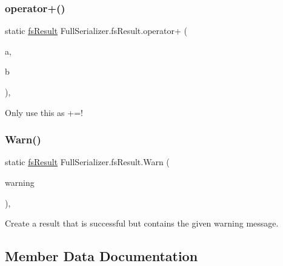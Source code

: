 \subsubsection{\texorpdfstring{operator+()}{operator+()}}
{\footnotesize\ttfamily static \hyperlink{struct_full_serializer_1_1fs_result}{fs\+Result} Full\+Serializer.\+fs\+Result.\+operator+ (\begin{DoxyParamCaption}\item[{\hyperlink{struct_full_serializer_1_1fs_result}{fs\+Result}}]{a,  }\item[{\hyperlink{struct_full_serializer_1_1fs_result}{fs\+Result}}]{b }\end{DoxyParamCaption})\hspace{0.3cm}{\ttfamily [inline]}, {\ttfamily [static]}}



Only use this as +=! 

\mbox{\label{struct_full_serializer_1_1fs_result_a28eab13689fc7ff2b0a1d0326e044463}} 
\subsubsection{\texorpdfstring{Warn()}{Warn()}}
{\footnotesize\ttfamily static \hyperlink{struct_full_serializer_1_1fs_result}{fs\+Result} Full\+Serializer.\+fs\+Result.\+Warn (\begin{DoxyParamCaption}\item[{string}]{warning }\end{DoxyParamCaption})\hspace{0.3cm}{\ttfamily [inline]}, {\ttfamily [static]}}



Create a result that is successful but contains the given warning message. 



\subsection{Member Data Documentation}
\mbox{\label{struct_full_serializer_1_1fs_result_a21c921f6a0a99b1ba5acc993e669f3cc}} 
